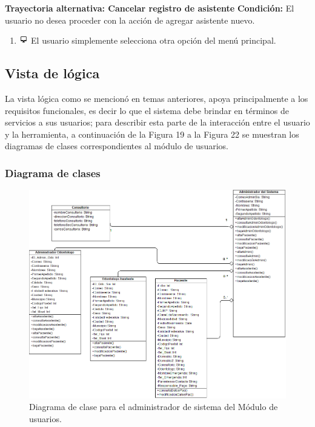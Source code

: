 \textbf{Trayectoria alternativa: Cancelar registro de asistente} 
\vspace{0.3em}
\textbf{Condición:} El usuario no desea proceder con la acción de agregar asistente nuevo.
\begin{enumerate}
\item \includegraphics[height=1em]{pictures/sistema.png} El usuario simplemente selecciona otra opción del menú principal.
\end{enumerate} \bigskip





\newpage
\subsection{Vista de lógica}
La vista lógica como se mencionó en temas anteriores, apoya principalmente a los requisitos funcionales, es decir lo que el sistema debe brindar en términos de servicios a sus usuarios; para describir esta parte de la interacción entre el usuario y la herramienta, a continuación de la Figura 19 a la Figura 22 se muestran los diagramas de clases correspondientes al módulo de usuarios.
\subsubsection{Diagrama de clases}
\begin{figure}[H]
\centering
\includegraphics[width=16cm,keepaspectratio]{pictures/DiagramaClase_AdminSis_Prototipo1.png}
\caption{Diagrama de clase para el administrador de sistema del Módulo de usuarios.}
\end{figure}

